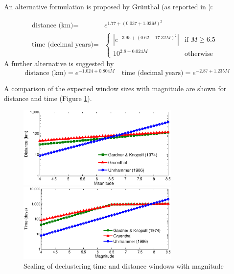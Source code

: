 An alternative formulation is proposed by Gr\"unthal (as reported in \cite{vanStiphout2012}):

\begin{equation}\begin{split} 
\mbox{distance (km)} = & e^{1.77 + \left( {0.037 + 1.02 M} \right)^2} \\ 
   \mbox{time (decimal years)} = & \begin{cases}   |e^{-3.95+ \left( {0.62 + 17.32 M}
    \right)^2}|    & \text{if $M \geq 6.5$ } \\ 10^{2.8 + 0.024 M} & 
    \text{otherwise}  \end{cases}\end{split}
\end{equation}
A further alternative is suggested by \cite{Uhrhammer1986}
%
\begin{equation}
\mbox{distance (km)} = e^{-1.024 + 0.804 M} \quad \mbox{time (decimal years)} = 
    e^{-2.87 + 1.235 M}
\end{equation}

A comparison of the expected window sizes with magnitude are shown for 
distance  and time (Figure \ref{fig:declust_scaling}).

\begin{figure}[htb]
  \centering
  \begin{subcaption}
      \centering
      \includegraphics[width=8cm]{./figures/declustering_distance_windows.eps}
	\end{subcaption}
  \begin{subcaption}
      \centering
      \includegraphics[width=8cm]{./figures/declustering_time_windows.eps}
	\end{subcaption}	
	\caption{Scaling of declustering time and distance windows with magnitude}
	\label{fig:declust_scaling}
\end{figure}

